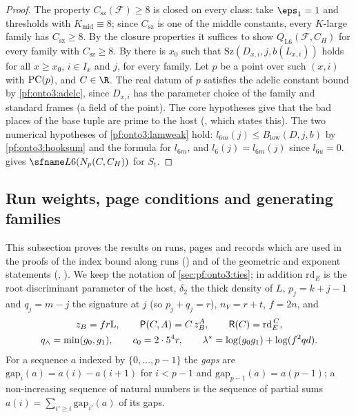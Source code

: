 \begin{proof}
The property $C_{\mathrm{sz}}(\mathcal F)\ge8$ is closed on every class: take $\eps_1=1$ and thresholds with
$K_{\mathrm{mid}}\equiv8$; since $C_{\mathrm{sz}}$ is one of the middle constants, every $K$-large family has
$C_{\mathrm{sz}}\ge8$. By the closure
properties it suffices to show $Q_{\mathrm{L6}}(\mathcal F,C_H)$ for every family with $C_{\mathrm{sz}}\ge8$. By
 there is $x_0$ such that
$\mathrm{Sz}(D_{x,i},j,b(L_{x,i}))$ holds for all $x\ge x_0$, $i\in I_x$ and $j$, for every family. Let $p$ be a point
over such $(x,i)$ with $\mathrm{PC}(p)$, and $C\in\R$. The real datum of $p$ satisfies the adelic constant bound by
\cref{pf:onto3:adelc}, since $D_{x,i}$ has the parameter choice of the family and standard frames (a field of the
point). The core hypotheses give that the bad places of the base tuple are prime to the host
(, which states this). The two numerical hypotheses of
\cref{pf:onto3:lamweak} hold: $l_{6m}(j)\le B_{\mathrm{low}}(D,j,b)$ by \cref{pf:onto3:hooksum} and the formula for
$l_{6m}$, and $l_6(j)=l_{6m}(j)$ since $l_{6u}=0$.  gives $\ontothreeLsix(N_p(C,C_H))$ for
$S_{\mathrm t}$.
\end{proof}

\subsection{Run weights, page conditions and generating families}\label{sec:pf:onto3:runw}

This subsection proves the results on runs, pages and records which are used in the proofs of the index bound
along runs () and of the geometric and exponent statements
(,
). We keep the notation of
\cref{sec:pf:onto3:ties}; in addition $\mathrm{rd}_E$ is the root discriminant parameter of the host, $\delta_2$ the
thick density of $L$, $p_j=k+j-1$ and $q_j=m-j$ the signature at $j$ (so $p_j+q_j=r$), $n_V=r+t$, $f=2n$, and
\begin{gather*}
z_B=fr\mathrm L,\qquad \mathsf{P}(C,A)=C\,z_B^{A},\qquad \mathsf{R}(C)=\mathrm{rd}_E^{\,C},\\
q_\wedge=\min(g_0,g_1),\qquad c_0=2\cdot5^4r,\qquad \lambda^*=\log(g_0g_1)+\log(f^2qd).
\end{gather*}
For a sequence $a$ indexed by $\{0,\dots,p-1\}$ the \emph{gaps} are $\mathrm{gap}_i(a)=a(i)-a(i+1)$ for $i<p-1$ and
$\mathrm{gap}_{p-1}(a)=a(p-1)$; a non-increasing sequence of natural numbers is the sequence of partial sums
$a(i)=\sum_{i'\ge i}\mathrm{gap}_{i'}(a)$ of its gaps.

